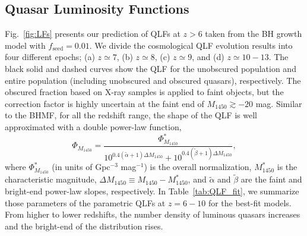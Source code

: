 \documentclass[twocolumn, twocolappendix]{aastex63}
\newcommand{\fseed}{f_\mathrm{seed}}
\newcommand{\Muv}{M_{1450}}
\begin{document}
\begin{CJK*}{UTF8}{gbsn}
\subsection{Quasar Luminosity Functions}
\label{sec:qlfglf}


Fig.~\ref{fig:LFs} presents our prediction of QLFs at $z>6$ taken from the BH growth model with $\fseed=0.01$.
We divide the cosmological QLF evolution results into four different epochs; (a) $z\simeq 7$, (b) $z\simeq 8$, (c) $z\simeq 9$, and (d) $z\simeq 10-13$.
The black solid and dashed curves show the QLF for the unobscured population 
and entire population (including unobscured and obscured quasars), respectively.
The obscured fraction based on X-ray samples \citep{2014ApJ...786..104U} is applied to faint objects, 
but the correction factor is highly uncertain at the faint end of $\Muv\gtrsim -20$ mag.
Similar to the BHMF, for all the redshift range, the shape of the QLF is well approximated with a double power-law function,
%
\begin{equation}
\Phi_{\Muv} = \frac{\Phi_{\Muv}^\ast}
{10^{0.4(\tilde \alpha+1)\Delta \Muv} + 10^{0.4(\tilde \beta+1)\Delta \Muv}},
\end{equation}
%
where $\Phi_{\Muv}^\ast$ (in units of Gpc$^{-3}$ mag$^{-1}$) is the overall normalization, $\Muv^\ast$ is the characteristic magnitude,
$\Delta \Muv \equiv \Muv - \Muv^\ast$, and $\tilde \alpha$ and $\tilde \beta$ are the faint and bright-end power-law slopes, respectively.
In Table~\ref{tab:QLF_fit}, we summarize those parameters of the parametric QLFs at $z=6-10$ for the best-fit models.
From higher to lower redshifts, the number density of luminous quasars increases and the bright-end of the distribution rises.



\end{CJK*}
\end{document}
